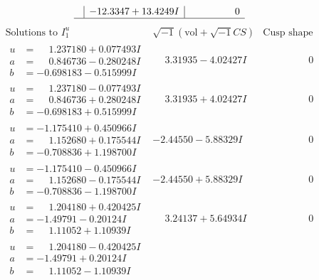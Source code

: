 \documentclass[1p]{elsarticle_modified}
\theoremstyle{definition}
\newcommand{\I}{\sqrt{-1}}
\begin{document}
$$\begin{array}{c|c|c}
 & -12.3347 + 13.4249 I & \phantom{-0.000000 } 0\\
 \hline 
 \end{array}$$\newpage$$\begin{array}{c|c|c}  
\text{Solutions to }I^u_{1}& \I (\text{vol} + \sqrt{-1}CS) & \text{Cusp shape}\\
 \hline 
\begin{aligned}
u &= \phantom{-}1.237180 + 0.077493 I \\
a &= \phantom{-}0.846736 - 0.280248 I \\
b &= -0.698183 - 0.515999 I\end{aligned}
 & \phantom{-}3.31935 - 4.02427 I & \phantom{-0.000000 } 0 \\ \hline\begin{aligned}
u &= \phantom{-}1.237180 - 0.077493 I \\
a &= \phantom{-}0.846736 + 0.280248 I \\
b &= -0.698183 + 0.515999 I\end{aligned}
 & \phantom{-}3.31935 + 4.02427 I & \phantom{-0.000000 } 0 \\ \hline\begin{aligned}
u &= -1.175410 + 0.450966 I \\
a &= \phantom{-}1.152680 + 0.175544 I \\
b &= -0.708836 + 1.198700 I\end{aligned}
 & -2.44550 - 5.88329 I & \phantom{-0.000000 } 0 \\ \hline\begin{aligned}
u &= -1.175410 - 0.450966 I \\
a &= \phantom{-}1.152680 - 0.175544 I \\
b &= -0.708836 - 1.198700 I\end{aligned}
 & -2.44550 + 5.88329 I & \phantom{-0.000000 } 0 \\ \hline\begin{aligned}
u &= \phantom{-}1.204180 + 0.420425 I \\
a &= -1.49791 - 0.20124 I \\
b &= \phantom{-}1.11052 + 1.10939 I\end{aligned}
 & \phantom{-}3.24137 + 5.64934 I & \phantom{-0.000000 } 0 \\ \hline\begin{aligned}
u &= \phantom{-}1.204180 - 0.420425 I \\
a &= -1.49791 + 0.20124 I \\
b &= \phantom{-}1.11052 - 1.10939 I\end{aligned}

\end{array}$$
\end{document}
